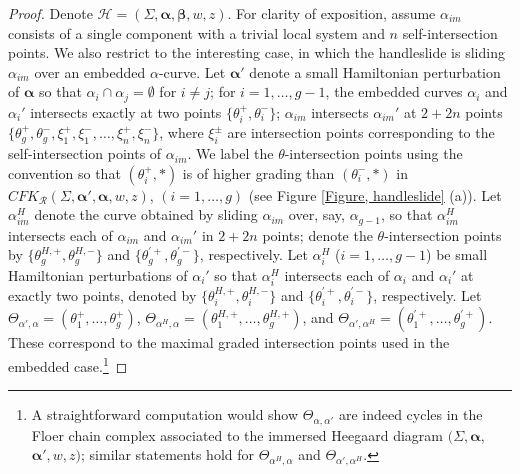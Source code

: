 \documentclass{amsart}
\theoremstyle{definition}
\theoremstyle{remark}
\numberwithin{equation}{section}
\numberwithin{equation}{section} \makeatletter
\begin{document}
\begin{proof}
Denote $\mathcal{H}=(\Sigma,\bm{\alpha},\bm{\beta},w,z)$. For clarity of exposition, assume $\alpha_{im}$ consists of a single component with a trivial local system and $n$ self-intersection points. We also restrict to the interesting case, in which the handleslide is sliding $\alpha_{im}$ over an embedded $\alpha$-curve. Let $\bm{\alpha'}$ denote a small Hamiltonian perturbation of $\bm{\alpha}$ so that $\alpha_i\cap \alpha_j=\emptyset$ for $i\neq j$; for $i=1,\ldots,g-1$, the embedded curves $\alpha_i$ and $\alpha_i'$ intersects exactly at two points $\{\theta_i^+,\theta_i^-\}$; $\alpha_{im}$ intersects $\alpha_{im}'$ at $2+2n$ points $\{\theta_g^+,\theta_g^-, \xi_1^+,\xi_1^-,\ldots,\xi_n^+,\xi_n^-\}$, where $\xi_i^{\pm}$ are intersection points corresponding to the self-intersection points of $\alpha_{im}$. We label the $\theta$-intersection points using the convention so that $(\theta_i^+,*)$ is of higher grading than $(\theta_i^-,*)$ in $CFK_\mathcal{R}(\Sigma,\bm{\alpha'},\bm{\alpha},w,z)$, $(i=1,\ldots,g)$ (see Figure \ref{Figure, handleslide} (a)). Let $\alpha_{im}^H$ denote the curve obtained by sliding $\alpha_{im}$ over, say, $\alpha_{g-1}$, so that $\alpha_{im}^H$ intersects each of $\alpha_{im}$ and $\alpha_{im}'$ in $2+2n$ points; denote the $\theta$-intersection points by $\{\theta_g^{H,+},\theta_g^{H,-}\}$ and $\{\theta_g^{'+},\theta_g^{'-}\}$, respectively. Let $\alpha_i^H$ ($i=1,\ldots, g-1$) be small Hamiltonian perturbations of $\alpha_i'$ so that $\alpha_i^H$ intersects each of $\alpha_i$ and $\alpha_i'$ at exactly two points, denoted by $\{\theta_i^{H,+},\theta_i^{H,-}\}$ and $\{\theta_i^{'+},\theta_i^{'-}\}$, respectively. Let $\Theta_{\alpha',\alpha}=(\theta_1^+,\ldots,\theta_g^+)$, $\Theta_{\alpha^H,\alpha}=(\theta_1^{H,+},\ldots,\theta_g^{H,+})$, and $\Theta_{\alpha',\alpha^H}=(\theta_1^{'+},\ldots,\theta_g^{'+})$. These correspond to the maximal graded intersection points used in the embedded case.\footnote{A straightforward computation would show $\Theta_{\alpha,\alpha'}$ are indeed cycles in the Floer chain complex associated to the immersed Heegaard diagram $(\Sigma, \bm{\alpha}$, $\bm{\alpha'},w,z)$; similar statements hold for $\Theta_{\alpha^H,\alpha}$ and $\Theta_{\alpha',\alpha^H}$.}


\end{proof}
\end{document}
